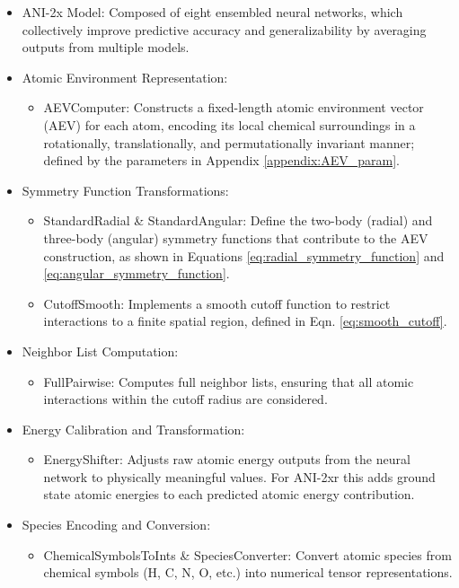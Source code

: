 \begin{itemize}
    \item ANI-2x Model: Composed of eight ensembled neural networks, which collectively improve predictive accuracy and generalizability by averaging outputs from multiple models.

    \item Atomic Environment Representation:
    \begin{itemize}
        \item AEVComputer: Constructs a fixed-length atomic environment vector (AEV) for each atom, encoding its local chemical surroundings in a rotationally, translationally, and permutationally invariant manner; defined by the parameters in Appendix \ref{appendix:AEV_param}.
    \end{itemize}

    \item Symmetry Function Transformations:
    \begin{itemize}
        \item StandardRadial \& StandardAngular: Define the two-body (radial) and three-body (angular) symmetry functions that contribute to the AEV construction, as shown in Equations \ref{eq:radial_symmetry_function} and \ref{eq:angular_symmetry_function}.
        \item CutoffSmooth: Implements a smooth cutoff function to restrict interactions to a finite spatial region, defined in Eqn. \ref{eq:smooth_cutoff}.
    \end{itemize}

    \item Neighbor List Computation:
    \begin{itemize}
        \item FullPairwise: Computes full neighbor lists, ensuring that all atomic interactions within the cutoff radius are considered.
    \end{itemize}

    \item Energy Calibration and Transformation:
    \begin{itemize}
        \item EnergyShifter: Adjusts raw atomic energy outputs from the neural network to physically meaningful values. For ANI-2xr this adds ground state atomic energies to each predicted atomic energy contribution.
    \end{itemize}

    \item Species Encoding and Conversion:
    \begin{itemize}
        \item ChemicalSymbolsToInts \& SpeciesConverter: Convert atomic species from chemical symbols (H, C, N, O, etc.) into numerical tensor representations.
    \end{itemize}
\end{itemize}

